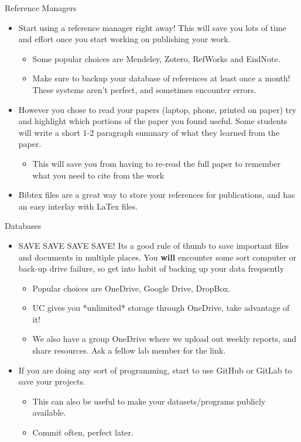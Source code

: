 \documentclass[handout]{beamer}
\begin{document}
\begin{frame}{Reference Managers}
\begin{itemize}
  \item Start using a reference manager right away! This will save you lots of time and effort once you start working on publishing your work.
  \begin{itemize}
      \item Some popular choices are Mendeley, Zotero, RefWorks and EndNote. 
      \item Make sure to backup your database of references at least once a month! These systems aren't perfect, and sometimes encounter errors.
  \end{itemize}
  \item However you chose to read your papers (laptop, phone, printed on paper) try and highlight which portions of the paper you found useful. Some students will write a short 1-2 paragraph summary of what they learned from the paper.
  \begin{itemize}
      \item This will save you from having to re-read the full paper to remember what you need to cite from the work
  \end{itemize}
  \item Bibtex files are a great way to store your references for publications, and has an easy interlay with LaTex files. 
\end{itemize}
\end{frame}

\begin{frame}{Databases}
\begin{itemize}
  \item SAVE SAVE SAVE SAVE! Its a good rule of thumb to save important files and documents in multiple places. You \textbf{will} encounter some sort computer or back-up drive failure, so get into habit of backing up your data frequently
  \begin{itemize}
      \item Popular choices are OneDrive, Google Drive, DropBox.
      \item UC gives you *unlimited* storage through OneDrive, take advantage of it!
      \item We also have a group OneDrive where we upload out weekly reports, and share resources. Ask a fellow lab member for the link.
  \end{itemize}
  \item If you are doing any sort of programming, start to use GitHub or GitLab to save your projects. 
  \begin{itemize}
      \item This can also be useful to make your datasets/programs publicly available.
      \item Commit often, perfect later. 
  \end{itemize}
\end{itemize}
\end{frame}
\end{document}
